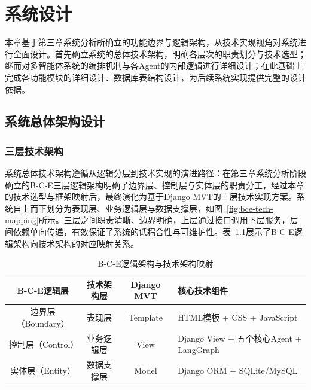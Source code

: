 \chapter{系统设计}

本章基于第三章系统分析所确立的功能边界与逻辑架构，从技术实现视角对系统进行全面设计。首先确立系统的总体技术架构，明确各层次的职责划分与技术选型；继而对多智能体系统的编排机制与各Agent的内部逻辑进行详细设计；在此基础上完成各功能模块的详细设计、数据库表结构设计，为后续系统实现提供完整的设计依据。


\section{系统总体架构设计}

\subsection{三层技术架构}

系统总体技术架构遵循从逻辑分层到技术实现的演进路径：在第三章系统分析阶段确立的B-C-E三层逻辑架构明确了边界层、控制层与实体层的职责分工，经过本章的技术选型与框架映射后，最终演化为基于Django MVT的三层技术实现方案。系统自上而下划分为表现层、业务逻辑层与数据支撑层，如图~\ref{fig:bce-tech-mapping}所示。三层之间职责清晰、边界明确，上层通过接口调用下层服务，层间依赖单向传递，有效保证了系统的低耦合性与可维护性。表~\ref{tab:bce-tech-mapping}展示了B-C-E逻辑架构向技术架构的对应映射关系。

\begin{table}[H]
\centering
\caption{B-C-E逻辑架构与技术架构映射}
\label{tab:bce-tech-mapping}
\begin{tabularx}{\textwidth}{|c|c|c|X|}
\hline
\textbf{B-C-E逻辑层} & \textbf{技术架构层} & \textbf{Django MVT} & \textbf{核心技术组件} \\
\hline
边界层（Boundary） & 表现层 & Template & HTML模板 + CSS + JavaScript \\
\hline
控制层（Control） & 业务逻辑层 & View & Django View + 五个核心Agent + LangGraph \\
\hline
实体层（Entity） & 数据支撑层 & Model & Django ORM + SQLite/MySQL \\
\hline
\end{tabularx}
\end{table}

